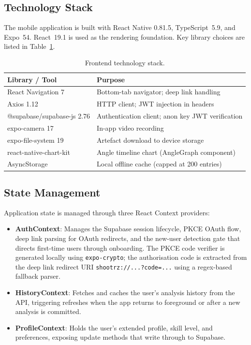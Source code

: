\subsection{Technology Stack}

The mobile application is built with React Native 0.81.5, TypeScript~5.9, and Expo~54. React~19.1 is used as the rendering foundation. Key library choices are listed in Table~\ref{tab:frontend_stack}.

\begin{table}[H]
  \centering
  \caption{Frontend technology stack.}
  \label{tab:frontend_stack}
  \begin{tabularx}{\textwidth}{lX}
    \toprule
    \textbf{Library / Tool} & \textbf{Purpose} \\
    \midrule
    React Navigation 7 & Bottom-tab navigator; deep link handling \\
    Axios 1.12 & HTTP client; JWT injection in headers \\
    @supabase/supabase-js 2.76 & Authentication client; anon key JWT verification \\
    expo-camera 17 & In-app video recording \\
    expo-file-system 19 & Artefact download to device storage \\
    react-native-chart-kit & Angle timeline chart (AngleGraph component) \\
    AsyncStorage & Local offline cache (capped at 200 entries) \\
    \bottomrule
  \end{tabularx}
\end{table}

\subsection{State Management}

Application state is managed through three React Context providers:

\begin{itemize}
  \item \textbf{AuthContext}: Manages the Supabase session lifecycle, PKCE OAuth flow, deep link parsing for OAuth redirects, and the new-user detection gate that directs first-time users through onboarding. The PKCE code verifier is generated locally using \lstinline|expo-crypto|; the authorisation code is extracted from the deep link redirect URI \lstinline|shootrz://...?code=...| using a regex-based fallback parser.
  \item \textbf{HistoryContext}: Fetches and caches the user's analysis history from the API, triggering refreshes when the app returns to foreground or after a new analysis is committed.
  \item \textbf{ProfileContext}: Holds the user's extended profile, skill level, and preferences, exposing update methods that write through to Supabase.
\end{itemize}

